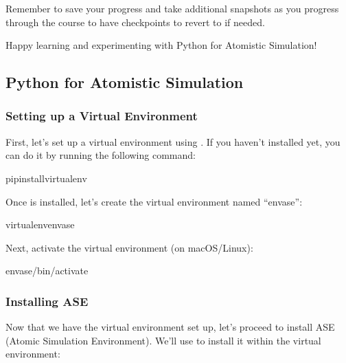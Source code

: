 \documentclass[letterpaper,10pt,english]{sphinxmanual}
\begin{document}
\sphinxAtStartPar
Remember to save your progress and take additional snapshots as you progress through the course to have checkpoints to revert to if needed.

\sphinxAtStartPar
Happy learning and experimenting with Python for Atomistic Simulation!

\sphinxstepscope


\subsection{Python for Atomistic Simulation}
\label{\detokenize{basics/basics:python-for-atomistic-simulation}}\label{\detokenize{basics/basics::doc}}

\subsubsection{Setting up a Virtual Environment}
\label{\detokenize{basics/basics:setting-up-a-virtual-environment}}
\sphinxAtStartPar
First, let’s set up a virtual environment using . If you haven’t installed  yet, you can do it by running the following command:

\begin{sphinxVerbatim}[commandchars=\\\{\}]
pipinstallvirtualenv
\end{sphinxVerbatim}

\sphinxAtStartPar
Once  is installed, let’s create the virtual environment named “envase”:

\begin{sphinxVerbatim}[commandchars=\\\{\}]
virtualenvenvase
\end{sphinxVerbatim}

\sphinxAtStartPar
Next, activate the virtual environment (on macOS/Linux):

\begin{sphinxVerbatim}[commandchars=\\\{\}]
envase/bin/activate
\end{sphinxVerbatim}


\subsubsection{Installing ASE}
\label{\detokenize{basics/basics:installing-ase}}
\sphinxAtStartPar
Now that we have the virtual environment set up, let’s proceed to install ASE (Atomic Simulation Environment). We’ll use  to install it within the virtual environment:
\end{document}
